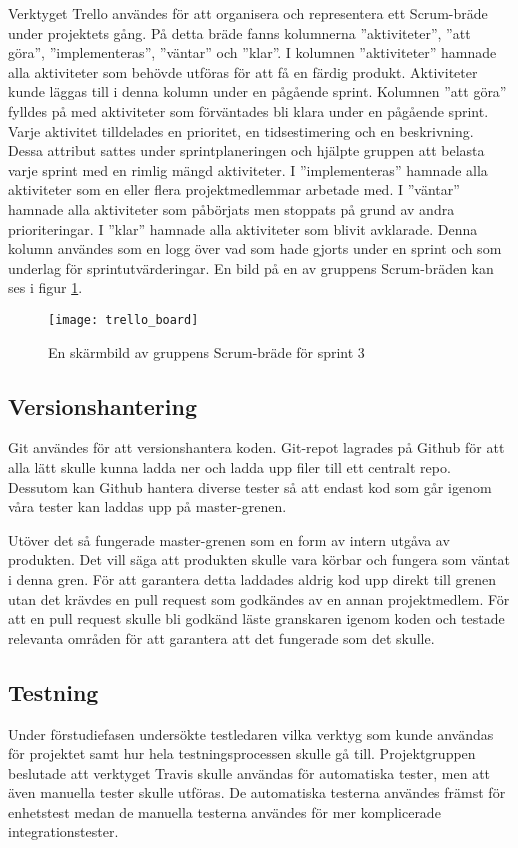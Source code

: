 Verktyget Trello användes för att organisera och representera ett Scrum-bräde under projektets gång. På detta bräde fanns kolumnerna ''aktiviteter'', ''att göra'', ''implementeras'', ''väntar'' och ''klar''. I kolumnen ''aktiviteter'' hamnade alla aktiviteter som behövde utföras för att få en färdig produkt. Aktiviteter kunde läggas till i denna kolumn under en pågående sprint. Kolumnen ''att göra'' fylldes på med aktiviteter som förväntades bli klara under en pågående sprint. Varje aktivitet tilldelades en prioritet, en tidsestimering och en beskrivning. Dessa attribut sattes under sprintplaneringen och hjälpte gruppen att belasta varje sprint med en rimlig mängd aktiviteter. I ''implementeras'' hamnade alla aktiviteter som en eller flera projektmedlemmar arbetade med. I ''väntar'' hamnade alla aktiviteter som påbörjats men stoppats på grund av andra prioriteringar. I ''klar'' hamnade alla aktiviteter som blivit avklarade. Denna kolumn användes som en logg över vad som hade gjorts under en sprint och som underlag för sprintutvärderingar. En bild på en av gruppens Scrum-bräden kan ses i figur \ref{fig:trello_board}.

\begin{figure}[h]
    \centering
    \texttt{[image: trello\_board]}
    \caption{En skärmbild av gruppens Scrum-bräde för sprint 3}
    \label{fig:trello_board}
\end{figure}

\pagebreak

\subsection{Versionshantering}
Git användes för att versionshantera koden. Git-repot lagrades på Github för att alla lätt skulle kunna ladda ner och ladda upp filer till ett centralt repo. Dessutom kan Github hantera diverse tester så att endast kod som går igenom våra tester kan laddas upp på master-grenen.

Utöver det så fungerade master-grenen som en form av intern utgåva av produkten. Det vill säga att produkten skulle vara körbar och fungera som väntat i denna gren. För att garantera detta laddades aldrig kod upp direkt till grenen utan det krävdes en pull request som godkändes av en annan projektmedlem. För att en pull request skulle bli godkänd läste granskaren igenom koden och testade relevanta områden för att garantera att det fungerade som det skulle.

\subsection{Testning}
Under förstudiefasen undersökte testledaren vilka verktyg som kunde användas för projektet samt hur hela testningsprocessen skulle gå till. Projektgruppen beslutade att verktyget Travis skulle användas för automatiska tester, men att även manuella tester skulle utföras. De automatiska testerna användes främst för enhetstest medan de manuella testerna användes för mer komplicerade integrationstester.

